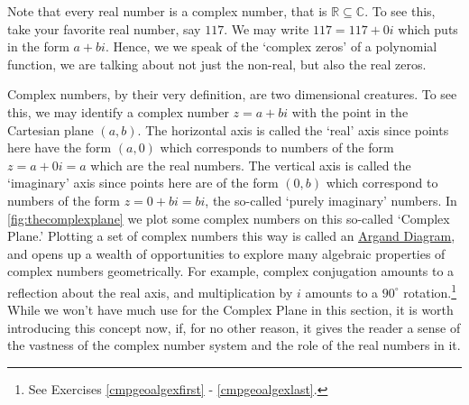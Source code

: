 Note that every real number is a complex number, that is $\mathbb{R} \subseteq \mathbb{C}$.  To see this, take your favorite real number, say $117$.  We may write $117 = 117 + 0 i$ which puts in the form $a + bi$.  Hence, we we speak of the `complex zeros' of a polynomial function, we are talking about not just the non-real, but also the real zeros.

Complex numbers, by their very definition, are two dimensional creatures.  To see this, we may identify a complex number $z = a+bi$ with the point in the Cartesian plane $(a,b)$. The horizontal axis is called the `real' axis since points here have the form $(a,0)$ which corresponds to numbers of the form $z = a + 0i = a$ which are the real numbers. The vertical axis is called the `imaginary' axis since points here are of the form $(0,b)$ which correspond to numbers of the form $z = 0+bi = bi$,  the so-called `purely imaginary' numbers.  In \autoref{fig:thecomplexplane} we plot some complex numbers on this so-called  `Complex Plane.'  Plotting a set of complex numbers this way is called an \href{https://en.wikipedia.org/wiki/Complex_plane}{\underline{Argand Diagram}}, and opens up a wealth of opportunities to explore many algebraic properties of complex numbers geometrically. For example, complex conjugation amounts to a reflection about the real axis, and multiplication by $i$ amounts to a $90^{\circ}$ rotation.\footnote{See Exercises \ref{cmpgeoalgexfirst} - \ref{cmpgeoalgexlast}.}  While we won't have much use for the Complex Plane in this section, it is worth introducing this concept now, if, for no other reason, it gives the reader a sense of the vastness of the complex number system and the role of the real numbers in it.

